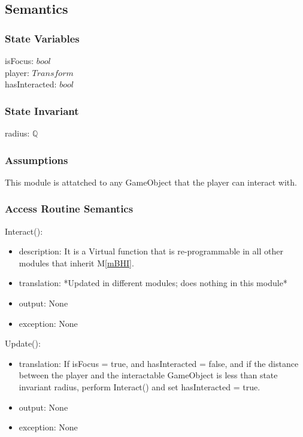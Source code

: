 \documentclass[12pt]{article}
\newcommand{\mref}[1]{M\ref{#1}}
\begin{document}
\subsection* {Semantics}

\subsubsection* {State Variables}

isFocus: $bool$\\
player: $Transform$\\
hasInteracted: $bool$

\subsubsection* {State Invariant}

radius: $\mathbb{Q}$\\

\subsubsection* {Assumptions}

This module is attatched to any GameObject that the player can interact with. 

\subsubsection* {Access Routine Semantics}

\noindent Interact():
\begin{itemize}
\item description: It is a Virtual function that is re-programmable in all other modules that inherit \mref{mBHI}.
\item translation: *Updated in different modules; does nothing in this module*
\item output: None
\item exception: None
\end{itemize}

\noindent Update():
\begin{itemize}
\item translation: If isFocus = true, and hasInteracted = false, and if the distance between the player and the interactable GameObject is less than state invariant radius, perform Interact() and set hasInteracted = true.
\item output: None
\item exception: None
\end{itemize}
\end{document}
